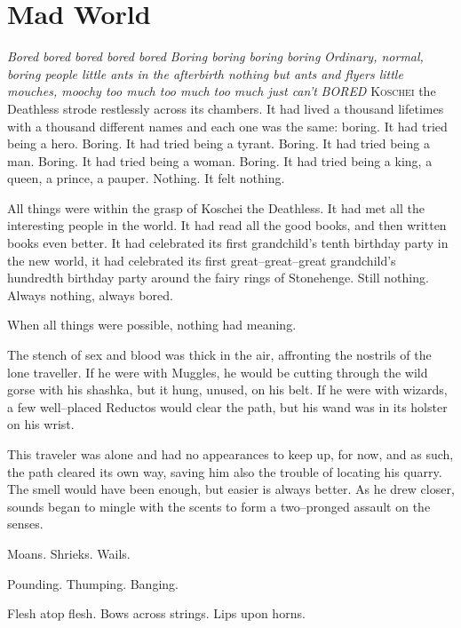 \chapter{Mad World}

\SmallVSpace
\emph{Bored bored bored bored bored}
\SmallVSpace
\emph{Boring boring boring boring}
\SmallVSpace
\emph{Ordinary, normal, boring people little ants in the afterbirth nothing but ants and flyers little mouches, moochy too much too much too much just can’t}
\SmallVSpace
\emph{BORED}
\SmallVSpace
\lettrine{K}{oschei} the Deathless strode restlessly across its chambers. It had lived a thousand lifetimes with a thousand different names and each one was the same: boring. It had tried being a hero. Boring. It had tried being a tyrant. Boring. It had tried being a man. Boring. It had tried being a woman. Boring. It had tried being a king, a queen, a prince, a pauper. Nothing. It felt nothing.

All things were within the grasp of Koschei the Deathless. It had met all the interesting people in the world. It had read all the good books, and then written books even better. It had celebrated its first grandchild’s tenth birthday party in the new world, it had celebrated its first great\mbox{--}great\mbox{--}great grandchild’s hundredth birthday party around the fairy rings of Stonehenge. Still nothing. Always nothing, always bored.

When all things were possible, nothing had meaning.
\simpleline
{}

The stench of sex and blood was thick in the air, affronting the nostrils of the lone traveller. If he were with Muggles, he would be cutting through the wild gorse with his shashka, but it hung, unused, on his belt. If he were with wizards, a few well\mbox{--}placed Reductos would clear the path, but his wand was in its holster on his wrist.

This traveler was alone and had no appearances to keep up, for now, and as such, the path cleared its own way, saving him also the trouble of locating his quarry. The smell would have been enough, but easier is always better. As he drew closer, sounds began to mingle with the scents to form a two\mbox{--}pronged assault on the senses.

Moans. Shrieks. Wails.

Pounding. Thumping. Banging.

Flesh atop flesh. Bows across strings. Lips upon horns.

